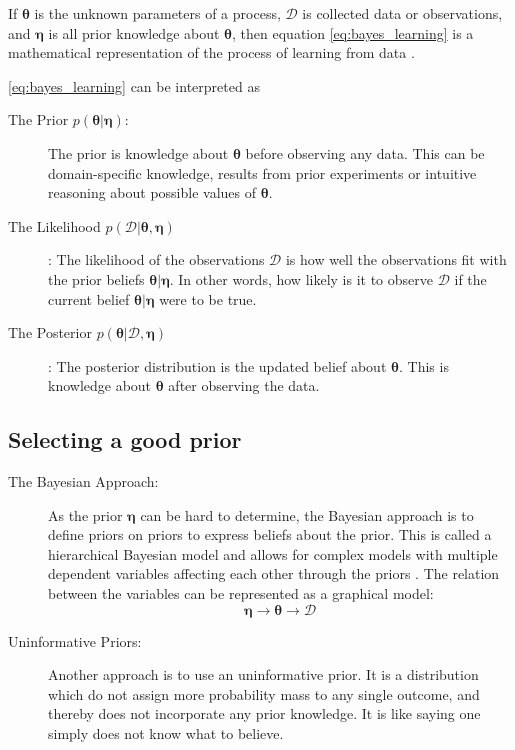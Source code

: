 If $\boldsymbol{\theta}$ is the unknown parameters of a process, $\mathcal{D}$ is collected data or observations, and $\boldsymbol{\eta}$ is all prior knowledge about $\boldsymbol{\theta}$, then equation \eqref{eq:bayes_learning} is a mathematical representation of the process of learning from data \cite{Jaynes86bayesianmethods:}.

\cref{eq:bayes_learning} can be interpreted as
\begin{description}
    \item[The Prior $p(\boldsymbol{\theta} | \boldsymbol{\eta})$:] The prior is knowledge about $\boldsymbol{\theta}$ before observing any data. This can be domain-specific knowledge, results from prior experiments or intuitive reasoning about possible values of $\boldsymbol{\theta}$. 
    \item[The Likelihood $p(\mathcal{D} | \boldsymbol{\theta}, \boldsymbol{\eta})$]: The likelihood of the observations $\mathcal{D}$ is how well the observations fit with the prior beliefs $\boldsymbol{\theta} | \boldsymbol{\eta}$. In other words, how likely is it to observe $\mathcal{D}$ if the current belief $\boldsymbol{\theta} | \boldsymbol{\eta}$ were to be true.
    \item[The Posterior $p(\boldsymbol{\theta} | \mathcal{D}, \boldsymbol{\eta})$]: The posterior distribution is the updated belief about $\boldsymbol{\theta}$. This is knowledge about $\boldsymbol{\theta}$ after observing the data. 
\end{description}

\subsection{Selecting a good prior}

\begin{description}
\item[The Bayesian Approach:]As the prior $\boldsymbol{\eta}$ can be hard to determine, the Bayesian approach is to define priors on priors to express beliefs about the prior. This is called a hierarchical Bayesian model and allows for complex models with multiple dependent variables affecting each other through the priors \cite{murphy}. The relation between the variables can be represented as a graphical model:
$$\boldsymbol{\eta} \rightarrow \boldsymbol{\theta} \rightarrow{\mathcal{D}}$$

\item[Uninformative Priors:]Another approach is to use an uninformative prior. It is a distribution which do not assign more probability mass to any single outcome, and thereby does not incorporate any prior knowledge. It is like saying one simply does not know what to believe.
\end{description}


